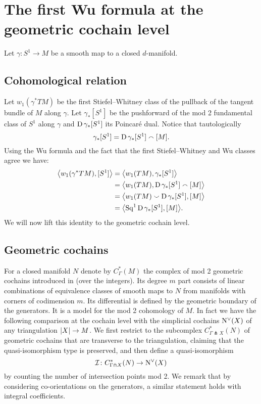 
\section*{The first Wu formula at the geometric cochain level} \label{s:statement}

Let $\gamma \colon S^1 \to M$ be a smooth map to a closed $d$-manifold.

\subsection*{Cohomological relation}

Let $w_1(\gamma^\ast TM)$ be the first Stiefel--Whitney class of the pullback of the tangent bundle of $M$ along $\gamma$.
Let $\gamma_\ast[S^1]$ be the pushforward of the mod 2 fundamental class of $S^1$ along $\gamma$ and $\dual \gamma_\ast[S^1]$ its Poincar\'e dual.
Notice that tautologically
\[
\gamma_\ast[S^1] = \dual \gamma_\ast[S^1] \smallfrown [M].
\]
Using the Wu formula and the fact that the first Stiefel--Whitney and Wu classes agree we have:
\begin{align*}
	\angles[\big]{w_1(\gamma^\ast TM), [S^1]} &=
	\angles[\big]{w_1(TM), \gamma_\ast [S^1]} \\ &=
	\angles[\big]{w_1(TM), \dual \gamma_\ast[S^1] \smallfrown [M]} \\ &=
	\angles[\big]{w_1(TM) \smallsmile \dual \gamma_\ast[S^1], [M]} \\ &=
	\angles[\big]{\Sq^1 \dual \gamma_\ast[S^1], [M]}.
\end{align*}
We will now lift this identity to the geometric cochain level.

\subsection*{Geometric cochains}

For a closed manifold $N$ denote by $C^*_{\Gamma}(M)$ the complex of mod 2 geometric cochains introduced in \cite{medina2021flowing} (over the integers).
Its degree $m$ part consists of linear combinations of equivalence classes of smooth maps to $N$ from manifolds with corners of codimension $m$.
Its differential is defined by the geometric boundary of the generators.
It is a model for the mod 2 cohomology of $M$.
In fact we have the following comparison at the cochain level with the simplicial cochains $\cochains(X)$ of any triangulation $\bars{X} \to M$.
We first restrict to the subcomplex $C^*_{\Gamma \pitchfork X}(N)$ of geometric cochains that are transverse to the triangulation, claiming that the quasi-isomorphism type is preserved, and then define a quasi-isomorphism
\[
\cI \colon C^*_{\Gamma \pitchfork X}(N) \to \cochains(X)
\]
by counting the number of intersection points mod 2.
We remark that by considering co-orientations on the generators, a similar statement holds with integral coefficients.

